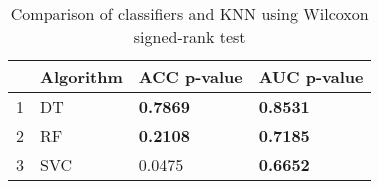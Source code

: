 \begin{table}
\footnotesize
\caption{Comparison of classifiers and KNN using Wilcoxon signed-rank test}
\label{tab:wilcoxon comparison}
\begin{tabular}{llll}
\hline
 & Algorithm & ACC p-value & AUC p-value \\
\hline
1 & DT & \textbf{0.7869} & \textbf{0.8531} \\
2 & RF & \textbf{0.2108} & \textbf{0.7185} \\
3 & SVC & 0.0475 & \textbf{0.6652} \\
\hline
\end{tabular}
\end{table}
